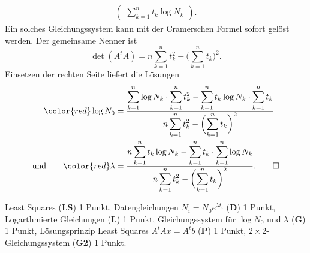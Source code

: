 \begin{loesung}
\begin{align*}
\begin{pmatrix}
\displaystyle \sum_{k=1}^n t_k \log N_k
\end{pmatrix}.
\end{align*}
Ein solches Gleichungssystem kann mit der Cramerschen Formel sofort gelöst
werden.
Der gemeinsame Nenner ist
\[
\det(A^tA)
=
n\sum_{k=1}^n t_k^2 - \biggl(\sum_{k=1}^n t_k\biggr)^2.
\]
Einsetzen der rechten Seite liefert die Lösungen
\begin{align*}
{\color{red}\log N_0}
&=
\frac{
\displaystyle
\sum_{k=1}^n \log N_k \cdot \sum_{k=1}^n t_k^2
-
\sum_{k=1}^n t_k\log N_k \cdot \sum_{k=1}^n t_k
}{
\displaystyle
n\sum_{k=1}^n t_k^2 - \biggl(\sum_{k=1}^n t_k\biggr)^2}
\\
\text{und}
\qquad
{\color{red}\lambda}
&=
\frac{
\displaystyle
n \sum_{k=1}^n t_k\log N_k
-
\sum_{k=1}^n t_k \cdot \sum_{k=1}^n \log N_k
}{
\displaystyle
n\sum_{k=1}^n t_k^2 - \biggl(\sum_{k=1}^n t_k\biggr)^2}.
\qedhere
\end{align*}
\end{loesung}

\begin{bewertung}
Least Squares ({\bf LS}) 1 Punkt,
Datengleichungen $N_i = N_0e^{\lambda t_i}$ ({\bf D}) 1 Punkt,
Logarthmierte Gleichungen ({\bf L}) 1 Punkt,
Gleichungssystem für $\log N_0$ und $\lambda$ ({\bf G}) 1 Punkt,
Lösungsprinzip Least Squares $A^tAx=A^tb$ ({\bf P}) 1 Punkt,
$2\times 2$-Gleichungssystem ({\bf G2}) 1 Punkt.
\end{bewertung}



